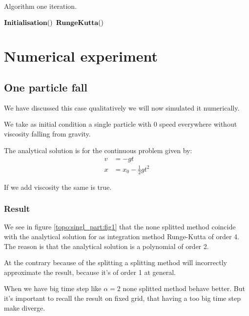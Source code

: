 \begin{algorithm}
\caption{Algorithm one iteration.}
\label{code:RungeKutta3}
\begin{algorithmic}[1]
\State $\mathop{\textbf{Initialisation}}()$
\State $\mathop{\textbf{RungeKutta}}()$
\EndProcedure
        \end{algorithmic}
\end{algorithm}

\FloatBarrier
\section{Numerical experiment}

\subsection{One particle fall}

We have discussed this case qualitatively we will now simulated it numerically.

We take as initial condition a single particle with 0 speed everywhere without viscosity falling from gravity.

The analytical solution is for the continuous problem given by:
\begin{align}
v&=-gt\\
x&=x_0-\frac{1}{2}gt^2
\end{align}

If we add viscosity the same is true.

\subsubsection{Result}

We see in figure \ref{topo:singl_part:fig1} that the none splitted method coincide with the analytical solution for as
integration method Runge-Kutta of order 4. The reason is that the analytical solution is a polynomial of order 2.

At the contrary because of the splitting a splitting method will incorrectly approximate the result, because it's of order 1 at general.

When we have big time step like $\alpha=2$ none splitted method behave better. But it's important to recall the result on fixed grid,
that having a too big time step make diverge.

